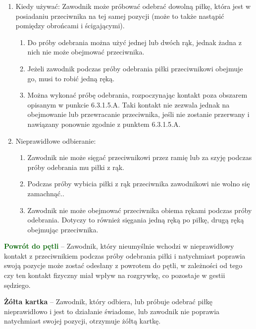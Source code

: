 \documentclass[12pt]{article}
\newcommand\yellowcard[1]{\bgroup\textcolor{darkyellow}{\textbf{#1}}}
\newcommand\other[1]{\bgroup\textcolor{darkgreen}{\textbf{#1}}}
\begin{document}
\begin{enumerate}
	\item
	      Kiedy używać: Zawodnik może próbować odebrać dowolną piłkę, która jest
	      w posiadaniu przeciwnika na tej samej pozycji (może to także nastąpić
	      pomiędzy obrońcami i ścigającymi).

	      \begin{enumerate}
		      \item
		            Do próby odebrania można użyć jednej lub dwóch rąk, jednak żadna z
		            nich nie może obejmować przeciwnika.
		      \item
		            Jeżeli zawodnik podczas próby odebrania piłki przeciwnikowi obejmuje
		            go, musi to robić jedną ręką.
		      \item
		            Można wykonać próbę odebrania, rozpoczynając kontakt poza obszarem
		            opisanym w punkcie 6.3.1.5.A. Taki kontakt nie zezwala jednak na
		            obejmowanie lub przewracanie przeciwnika, jeśli nie zostanie
		            przerwany i nawiązany ponownie zgodnie z punktem 6.3.1.5.A.
	      \end{enumerate}
	\item
	      Nieprawidłowe odbieranie:

	      \begin{enumerate}
		      \item
		            Zawodnik nie może sięgać przeciwnikowi przez ramię lub za szyję
		            podczas próby odebrania mu piłki z rąk.
		      \item
		            Podczas próby wybicia piłki z rąk przeciwnika zawodnikowi nie wolno
		            się zamachnąć..
		      \item
		            Zawodnik nie może obejmować przeciwnika obiema rękami podczas próby
		            odebrania. Dotyczy to również sięgania jedną ręką po piłkę, drugą
		            ręką obejmując przeciwnika.
	      \end{enumerate}
\end{enumerate}

\other{Powrót do pętli} -- Zawodnik, który nieumyślnie wchodzi w
nieprawidłowy kontakt z przeciwnikiem podczas próby odebrania piłki i
natychmiast poprawia swoją pozycje może zostać odesłany z powrotem do
pętli, w zależności od tego czy ten kontakt fizyczny miał wpływ na
rozgrywkę, co pozostaje w gestii sędziego.

\yellowcard{Żółta kartka} -- Zawodnik, który odbiera, lub próbuje odebrać piłkę
nieprawidłowo i jest to działanie świadome, lub zawodnik nie poprawia
natychmiast swojej pozycji, otrzymuje żółtą kartkę.
\end{document}
